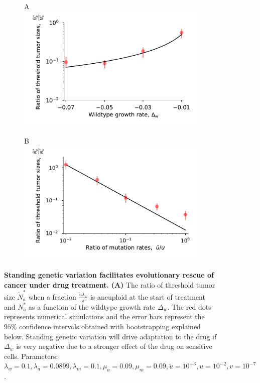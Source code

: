 \documentclass[12pt]{extarticle}
\begin{document}
\begin{figure}
\begin{subfigure}{0.5\textwidth}
A\\
\includegraphics[width=1\textwidth]{Figures/RatiodwPlot.pdf}
\end{subfigure}
\begin{subfigure}{0.5\textwidth}
B\\
\includegraphics[width=1\textwidth]{Figures/ratio_uPlot.pdf}
\end{subfigure}
\caption{
\textbf{Standing genetic variation facilitates evolutionary rescue of cancer under drug treatment.}
\textbf{(A)}  The ratio of threshold tumor size $\tilde{N}_a^*$ when a fraction $\frac{\tilde{u}\lambda_w}{s}$ is aneuploid at the start of treatment and $N_a^*$ as a function of the wildtype growth rate $\Delta_w$. The red dots represents numerical simulations and the error bars represent the $95\%$ confidence intervals obtained with bootstrapping explained below. Standing genetic variation will drive adaptation to the drug if $\Delta_w$ is very negative due to a stronger effect of the drug on sensitive cells. Parameters: $\lambda_w=0.1,\lambda_a=0.0899,\lambda_m=0.1,\mu_a=0.09,\mu_m=0.09,\tilde{u}=10^{-3},u=10^{-2}, v=10^{-7}$.
}
\end{figure}
\end{document}
